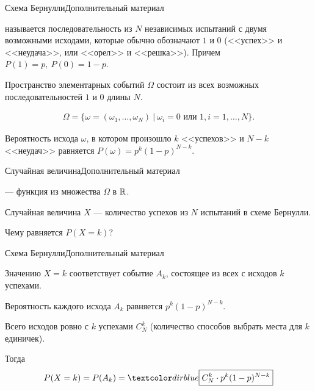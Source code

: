 \begin{frame}{Схема Бернулли}{Дополнительный материал}

 {} называется последовательность из $N$ независимых испытаний с двумя возможными исходами, которые обычно обозначают $1$ и $0$ (<<успех>> и <<неудача>>, или
<<орел>> и <<решка>>). Причем $P(1)=p,\ P(0)=1-p$.

Пространство элементарных событий $\Omega$ состоит из всех возможных последовательностей $1$ и $0$ длины $N$. 

\begin{align*}
\Omega=\{\omega=(\omega_1,\ldots,\omega_N)\ |\ \omega_i =0 \text{ или } 1, i=1,\dots,N \}.
\end{align*}

Вероятность исхода $\omega$, в котором произошло $k$ <<успехов>> и $N-k$ <<неудач>> равняется $P(\omega)=p^k(1-p)^{N-k}.$


\end{frame}

\begin{frame}{Случайная величина}{Дополнительный материал}

 {} --- функция из множества $\Omega$ в $\mathbb{R}$.

\exmpl Случайная величина $X$ --- количество успехов из $N$ испытаний в схеме Бернулли.

Чему равняется $P(X=k)$?

\end{frame}

\begin{frame}{Схема Бернулли}{Дополнительный материал}

Значению $X=k$ соответствует событие $A_k$, состоящее из всех с исходов $k$ успехами.

Вероятность каждого исхода $A_k$ равняется $p^k(1-p)^{N-k}$.

Всего исходов ровно с $k$ успехами $C_N^k$ (количество способов выбрать места для $k$ единичек).

Тогда $$P(X=k)=P(A_k)=\acc{\boxed{C_N^k \cdot p^k(1-p)^{N-k}}}$$

\end{frame}


